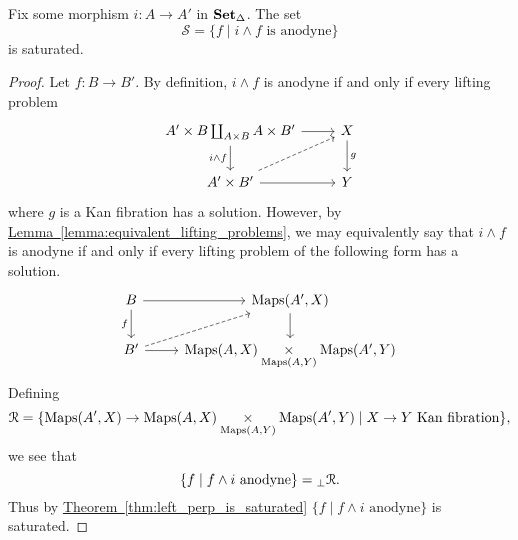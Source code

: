 \documentclass[main.tex]{subfiles}
\begin{document}
\begin{lemma}
  \label{lemma:set_of_morphisms_whose_smash_product_is_anodyne_is_saturated}
  Fix some morphism $i\colon A \to A'$ in $\operatorname{\mathbf{Set}_{\Delta}}$. The set
  \begin{equation*}
    \mathcal{S} = \{f \mid i \wedge f \text{ is anodyne}\}
  \end{equation*}
  is saturated.
\end{lemma}
\begin{proof}
  Let $f\colon B \to B'$. By definition, $i \wedge f$ is anodyne if and only if every lifting problem
  \begin{equation*}
    \begin{tikzcd}
      A' \times B \coprod_{A \times B} A \times B'
      \arrow[r]
      \arrow[d, swap, "i \wedge f"]
      & X
      \arrow[d, "g"]
      \\
      A' \times B'
      \arrow[r]
      \arrow[ur, dashed]
      & Y
    \end{tikzcd}
  \end{equation*}
  where $g$ is a Kan fibration has a solution. However, by \hyperref[lemma:equivalent_lifting_problems]{Lemma~\ref*{lemma:equivalent_lifting_problems}}, we may equivalently say that $i \wedge f$ is anodyne if and only if every lifting problem of the following form has a solution.
  \begin{equation*}
    \begin{tikzcd}
      B
      \arrow[r]
      \arrow[d, swap, "f"]
      & \Maps(A', X)
      \arrow[d]
      \\
      B'
      \arrow[r]
      \arrow[ur, dashed]
      & \Maps(A, X) \underset{\Maps(A, Y)}{\times} \Maps(A', Y)
    \end{tikzcd}
  \end{equation*}
  Defining
  \begin{equation*}
    \mathcal{R} = \{ \operatorname{Maps}(A', X) \to \operatorname{Maps}(A, X) \underset{\operatorname{Maps}(A, Y)}{\times} \operatorname{Maps}(A', Y) \mid X \to Y \text{ Kan fibration}\},
  \end{equation*}
  we see that
  \begin{equation*}
    \{f \mid f \wedge i \text{ anodyne}\} = {}_{\perp}\mathcal{R}.
  \end{equation*}
  Thus by \hyperref[thm:left_perp_is_saturated]{Theorem~\ref*{thm:left_perp_is_saturated}} $\{f \mid f \wedge i \text{ anodyne}\}$ is saturated.
\end{proof}
\end{document}
